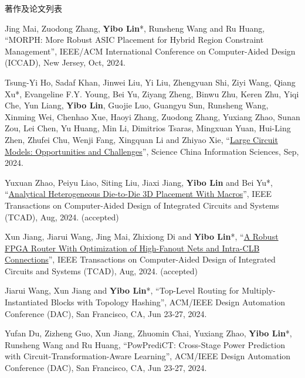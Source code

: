 \begin{rSection}{著作及论文列表}
\begin{description}[font=\normalfont, rightmargin=2em]
{}
            

\item[{[C158]}]{
        Jing Mai, Zuodong Zhang, \textbf{Yibo Lin}*, Runsheng Wang and Ru Huang, 
    ``MORPH: More Robust ASIC Placement for Hybrid Region Constraint Management'', 
    IEEE/ACM International Conference on Computer-Aided Design (ICCAD), New Jersey, Oct, 2024.
    
}
            

\item[{[J157]}]{
        Tsung-Yi Ho, Sadaf Khan, Jinwei Liu, Yi Liu, Zhengyuan Shi, Ziyi Wang, Qiang Xu*, Evangeline F.Y. Young, Bei Yu, Ziyang Zheng, Binwu Zhu, Keren Zhu, Yiqi Che, Yun Liang, \textbf{Yibo Lin}, Guojie Luo, Guangyu Sun, Runsheng Wang, Xinming Wei, Chenhao Xue, Haoyi Zhang, Zuodong Zhang, Yuxiang Zhao, Sunan Zou, Lei Chen, Yu Huang, Min Li, Dimitrios Tsaras, Mingxuan Yuan, Hui-Ling Zhen, Zhufei Chu, Wenji Fang, Xingquan Li and Zhiyao Xie, 
    ``\href{https://doi.org/10.1007/s11432-024-4155-7}{Large Circuit Models: Opportunities and Challenges}'', 
    Science China Information Sciences, Sep, 2024.
    
}
            

\item[{[J156]}]{
        Yuxuan Zhao, Peiyu Liao, Siting Liu, Jiaxi Jiang, \textbf{Yibo Lin} and Bei Yu*, 
    ``\href{https://doi.org/10.1109/TCAD.2024.3444716}{Analytical Heterogeneous Die-to-Die 3D Placement With Macros}'', 
    IEEE Transactions on Computer-Aided Design of Integrated Circuits and Systems (TCAD), Aug, 2024.
    (accepted)
}
            

\item[{[J155]}]{
        Xun Jiang, Jiarui Wang, Jing Mai, Zhixiong Di and \textbf{Yibo Lin}*, 
    ``\href{https://doi.org/10.1109/TCAD.2024.3447218}{A Robust FPGA Router With Optimization of High-Fanout Nets and Intra-CLB Connections}'', 
    IEEE Transactions on Computer-Aided Design of Integrated Circuits and Systems (TCAD), Aug, 2024.
    (accepted)
}
            

\item[{[C154]}]{
        Jiarui Wang, Xun Jiang and \textbf{Yibo Lin}*, 
    ``Top-Level Routing for Multiply-Instantiated Blocks with Topology Hashing'', 
    ACM/IEEE Design Automation Conference (DAC), San Francisco, CA, Jun 23-27, 2024.
    
}
            

\item[{[C153]}]{
        Yufan Du, Zizheng Guo, Xun Jiang, Zhuomin Chai, Yuxiang Zhao, \textbf{Yibo Lin}*, Runsheng Wang and Ru Huang, 
    ``PowPrediCT: Cross-Stage Power Prediction with Circuit-Transformation-Aware Learning'', 
    ACM/IEEE Design Automation Conference (DAC), San Francisco, CA, Jun 23-27, 2024.
    
}
\end{description}
\end{rSection}
